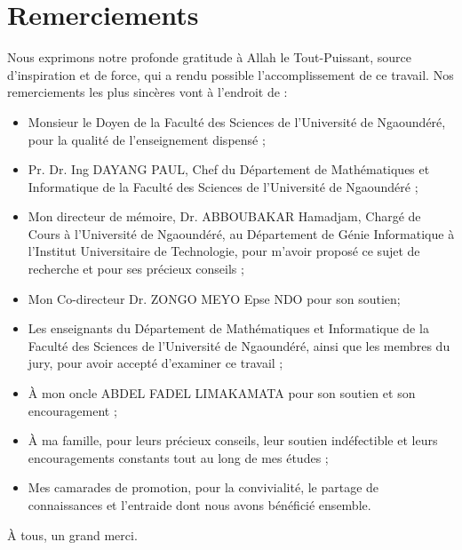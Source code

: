 \chapter*{Remerciements}

\renewcommand{\abstractnamefont}{\normalfont\Large\bfseries}


\hskip7mm
\begin{spacing}{1.3}
Nous exprimons notre profonde gratitude à Allah le Tout-Puissant, source d’inspiration et de force, qui a rendu possible l’accomplissement de ce travail. Nos remerciements les plus sincères vont à l’endroit de : 
\begin{itemize}
	\item Monsieur le Doyen de la Faculté des Sciences de l’Université de Ngaoundéré, pour la qualité de l’enseignement dispensé ;
    \item Pr. Dr. Ing DAYANG PAUL, Chef du Département de Mathématiques et Informatique de la Faculté des Sciences de l’Université de Ngaoundéré ;
    \item Mon directeur de mémoire, Dr. ABBOUBAKAR Hamadjam, Chargé de Cours à l’Université de Ngaoundéré, au Département de Génie Informatique à l’Institut Universitaire de Technologie, pour m'avoir proposé ce sujet de recherche et pour ses précieux conseils ;
    \item Mon Co-directeur Dr. ZONGO MEYO Epse NDO pour son soutien; 
    \item Les enseignants du Département de Mathématiques et Informatique de la Faculté des Sciences de l’Université de Ngaoundéré, ainsi que les membres du jury, pour avoir accepté d'examiner ce travail ;
    \item À mon oncle ABDEL FADEL LIMAKAMATA pour son soutien et son encouragement ;
    \item À ma famille, pour leurs précieux conseils, leur soutien indéfectible et leurs encouragements constants tout au long de mes études ;
    \item Mes camarades de promotion, pour la convivialité, le partage de connaissances et l'entraide dont nous avons bénéficié ensemble.
\end{itemize}

À tous, un grand merci.
\end{spacing}
